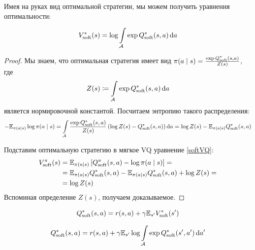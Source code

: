 
Имея на руках вид оптимальной стратегии, мы можем получить уравнения оптимальности:

\begin{theorem}
\begin{equation}\label{softV*Q*}
V^*_{\mathrm{soft}}(s) = \log \int\limits_{\mathcal{A}} \exp Q^*_{\mathrm{soft}}(s, a) \mathop{}\!\mathrm{d} a
\end{equation}
\begin{proof}
Мы знаем, что оптимальная стратегия имеет вид $\pi(a \mid s) \HM= \frac{\exp{Q^*_{\soft}(s, a)}}{Z(s)}$, где
$$Z(s) \coloneqq \int\limits_{\mathcal{A}} \exp Q^*_{\mathrm{soft}}(s, a) \mathop{}\!\mathrm{d} a$$
является нормировочной константой. Посчитаем энтропию такого распределения:
$$-\mathbb{E}_{\pi(a \mid s)} \log \pi(a \mid s) = \int\limits_{\mathcal{A}} \frac{\exp{Q^*_{\mathrm{soft}}(s, a)}}{Z(s)} \left(\log Z(s) - Q^*_{\mathrm{soft}}(s, a) \right) \mathop{}\!\mathrm{d} a = \log Z(s) - \mathbb{E}_{\pi(a \mid s)} Q^*_{\mathrm{soft}}(s, a)$$

Подставим оптимальную стратегию в мягкое VQ уравнение \eqref{softVQ}:
\begin{align*}
V^\pi_{\mathrm{soft}}(s) &= \mathbb{E}_{\pi(a \mid s)} \left[ Q^\pi_{\mathrm{soft}}(s, a) - \log \pi(a \mid s) \right] = \\ &= \mathbb{E}_{\pi(a \mid s)} Q^*_{\mathrm{soft}}(s, a) - \mathbb{E}_{\pi(a \mid s)} Q^*_{\mathrm{soft}}(s, a) + \log Z(s) = \\ &= \log Z(s)
\end{align*}
Вспоминая определение $Z(s)$, получаем доказываемое.
\end{proof}
\end{theorem}

\begin{proposition}
$$Q^*_{\mathrm{soft}}(s, a) = r(s, a) + \gamma \mathbb{E}_{s'} V^*_{\mathrm{soft}}(s')$$
\end{proposition}

\begin{proposition}
\begin{equation}\label{softQ*Q*}
Q^*_{\mathrm{soft}}(s, a) = r(s, a) + \gamma \mathbb{E}_{s'} \log \int\limits_{\mathcal{A}} \exp Q^*_{\mathrm{soft}}(s', a') \mathop{}\!\mathrm{d} a'
\end{equation}
\end{proposition}

